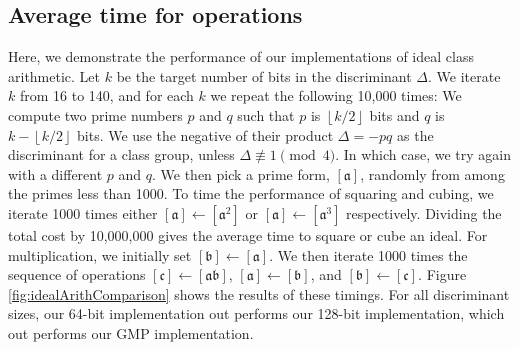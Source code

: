 \documentclass{ucalgthes1}
\theoremstyle{definition}
\newcommand{\floor}[1]{\left\lfloor #1 \right\rfloor}
\begin{document}
\subsection{Average time for operations}

Here, we demonstrate the performance of our implementations of ideal class arithmetic. Let $k$ be the target number of bits in the discriminant $\Delta$.  We iterate $k$ from 16 to 140, and for each $k$ we repeat the following 10,000 times: We compute two prime numbers $p$ and $q$ such that $p$ is $\floor{k/2}$ bits and $q$ is $k-\floor{k/2}$ bits.  We use the negative of their product $\Delta = -pq$ as the discriminant for a class group, unless $\Delta \not\equiv 1 \pmod 4$. In which case, we try again with a different $p$ and $q$.  We then pick a prime form, $[\mathfrak a]$, randomly from among the primes less than 1000.  To time the performance of squaring and cubing, we iterate 1000 times either $[\mathfrak a] \gets [\mathfrak a^2]$ or $[\mathfrak a] \gets [\mathfrak a^3]$ respectively.  Dividing the total cost by 10,000,000 gives the average time to square or cube an ideal.  For multiplication, we initially set $[\mathfrak b] \gets [\mathfrak a]$.  We then iterate 1000 times the sequence of operations $[\mathfrak c] \gets [\mathfrak a\mathfrak b]$, $[\mathfrak a] \gets [\mathfrak b]$, and $[\mathfrak b] \gets [\mathfrak c]$. Figure \ref{fig:idealArithComparison} shows the results of these timings. For all discriminant sizes, our 64-bit implementation out performs our 128-bit implementation, which out performs our GMP implementation.
\end{document}
